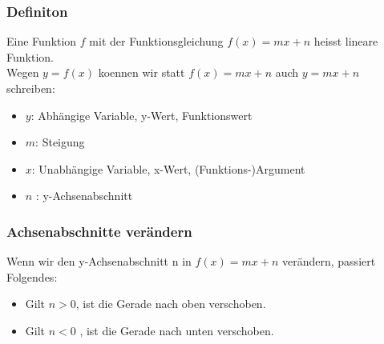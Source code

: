 \begin{multicols}{2}
    \subsubsection{Definiton}
    \vspace{-4mm}
    Eine Funktion $f$ mit der Funktionsgleichung $f(x) = mx + n$ heisst lineare Funktion. \\
    Wegen $y = f(x)$ koennen wir statt $f(x) = mx + n$ auch $y = mx + n$ schreiben:
    \begin{itemize}
        \item $y$: Abhängige Variable, y-Wert, Funktionswert
        \item $m$: Steigung
        \item  $x$: Unabhängige Variable, x-Wert, (Funktions-)Argument
        \item $n$ : y-Achsenabschnitt
    \end{itemize}
    \subsubsection{Achsenabschnitte verändern}
    \vspace{-4mm}
    Wenn wir den y-Achsenabschnitt n in $f(x) = mx + n$ verändern, passiert Folgendes:
    \begin{itemize}
        \item Gilt $n > 0$, ist die Gerade nach oben verschoben.
        \item Gilt $n < 0$ , ist die Gerade nach unten verschoben.
    \end{itemize}


\end{multicols}
